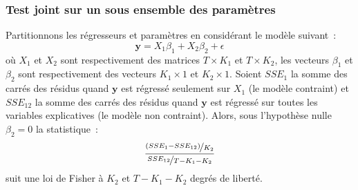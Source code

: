 \documentclass[10pt]{beamer}
\begin{document}
\begin{frame}
  \frametitle{Test joint sur un sous ensemble des paramètres}

  \begin{prop}\label{prop:test-subset-parameters}
    Partitionnons les régresseurs et paramètres en considérant le modèle suivant~:
    \[
      \mathbf y = X_1\beta_1 + X_2\beta_2 + \epsilon
    \]
    où $X_1$ et $X_2$ sont respectivement des matrices $T\times K_1$ et $T\times K_2$, les vecteurs $\beta_1$ et $\beta_2$ sont respectivement des vecteurs $K_1\times 1$ et $K_2\times 1$. Soient $SSE_1$ la somme des carrés des résidus quand $\mathbf y$ est régressé seulement sur $X_1$ (le modèle contraint) et $SSE_{12}$ la somme des carrés des résidus quand $\mathbf y$ est régressé sur toutes les variables explicatives (le modèle non contraint). Alors, sous l'hypothèse nulle $\beta_2=0$ la statistique~:
    \[
\frac{\nicefrac{\left(SSE_1-SSE_{12}\right)}{K_2}}{\nicefrac{SSE_{12}}{T-K_1-K_2}}
    \]
    suit une loi de Fisher à $K_2$ et $T-K_1-K_2$ degrés de liberté.
  \end{prop}

\end{frame}
\end{document}
